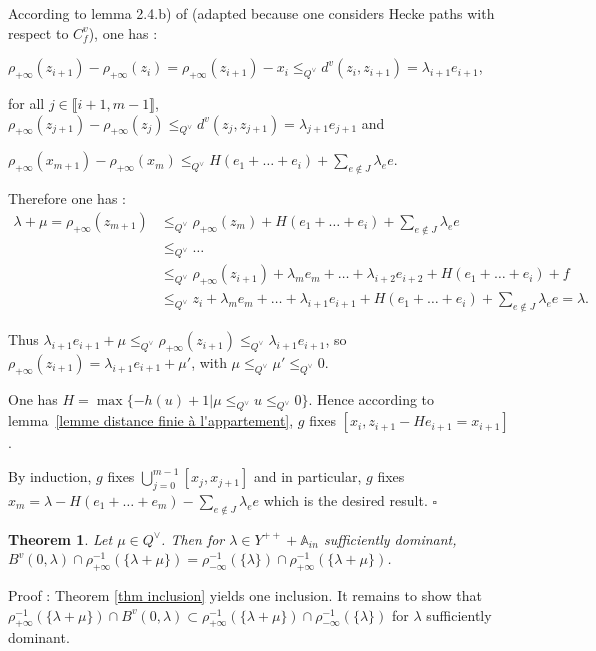 \documentclass[12pt]{article}
\theoremstyle{plain}
\newtheorem{thm}{Theorem}[section] %
\theoremstyle{definition}
\newcommand{\A}{\mathbb{A}}
\begin{document}
According to lemma 2.4.b) of \cite{gaussent2014spherical} (adapted because one considers Hecke paths with respect to $C^v_f$), one has : 

$\rho_{+\infty}(z_{i+1})-\rho_{+\infty}(z_i)=\rho_{+\infty}(z_{i+1})-x_i\leq_{Q^\vee}d^v(z_i,z_{i+1})=\lambda_{i+1}e_{i+1}$, 
 
for all $j\in \llbracket i+1, m-1\rrbracket$, $\rho_{+\infty}(z_{j+1})-\rho_{+\infty}(z_j)\leq_{Q^\vee} d^v(z_j,z_{j+1})= \lambda_{j+1}e_{j+1}$ and
 
$\rho_{+\infty}(x_{m+1})-\rho_{+\infty}(x_m)\leq_{Q^\vee} H(e_1+\ldots + e_i)+\sum_{e\notin J}\lambda_e e$.


Therefore one has :   \[\begin{aligned} \lambda+\mu =\rho_{+\infty}(z_{m+1})& \leq_{Q^\vee}\rho_{+\infty}(z_m)+H(e_1+\ldots+ e_i)+\sum_{e\notin J}\lambda_e e\\&\leq_{Q^\vee} \ldots \\ &\leq_{Q^\vee} \rho_{+\infty}(z_{i+1})+\lambda_m e_m+\ldots+\lambda_{i+2}e_{i+2}+H(e_1+\ldots+e_{i})+f\\ &\leq_{Q^\vee}z_i+\lambda_m e_m+\ldots+\lambda_{i+1}e_{i+1}+H(e_1+\ldots+e_i)+\sum_{e\notin J}\lambda_e e=\lambda.\end{aligned}\]

Thus $\lambda_{i+1}e_{i+1}+\mu\leq_{Q^\vee}\rho_{+\infty}(z_{i+1})\leq_{Q^\vee}\lambda_{i+1}e_{i+1}$, so $\rho_{+\infty}(z_{i+1})=\lambda_{i+1}e_{i+1}+\mu'$, with $\mu\leq_{Q^\vee} \mu'\leq_{Q^\vee} 0$.


One has $H=\max\{-h(u)+1|\mu\leq_{Q^\vee}u\leq_{Q^\vee}0\}$. Hence according to lemma~\ref{lemme distance finie à l'appartement}, $g$ fixes $[x_i,z_{i+1}-He_{i+1}=x_{i+1}]$. 
 
By induction, $g$ fixes $\bigcup_{j=0}^{m-1}[x_j,x_{j+1}]$ and in particular, $g$ fixes $x_m=\lambda-H(e_1+\ldots+e_m)-\sum_{e\notin J}\lambda_e e$ which is the desired result. $\square$
 


    
 \begin{thm}\label{thm égalité des ensembles bis}
 Let $\mu\in Q^\vee$. Then for $\lambda\in Y^{++}+\A_{in}$ sufficiently dominant, $B^v(0,\lambda)\cap \rho_{+\infty}^{-1}(\{\lambda+\mu\})=\rho_{-\infty}^{-1}(\{\lambda\})\cap\rho_{+\infty}^{-1}(\{\lambda+\mu\})$.
 \end{thm}
 
 
Proof : Theorem \ref{thm inclusion} yields one inclusion. It remains to show that $\rho_{+\infty}^{-1}(\{\lambda+\mu\})\cap B^v(0,\lambda)\subset\rho_{+\infty}^{-1}(\{\lambda+\mu\})\cap \rho_{-\infty}^{-1}(\{\lambda\})$ 
for $\lambda$ sufficiently dominant.
\end{document}
